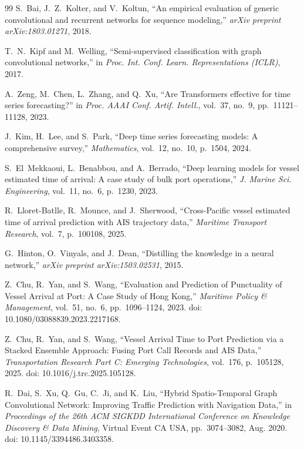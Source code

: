 \documentclass[conference]{IEEEtran}
\begin{document}
\begin{thebibliography}{99}
S.~Bai, J.~Z.~Kolter, and V.~Koltun, ``An empirical evaluation of generic convolutional and recurrent networks for sequence modeling,'' \textit{arXiv preprint arXiv:1803.01271}, 2018.

T.~N.~Kipf and M.~Welling, ``Semi-supervised classification with graph convolutional networks,'' in \textit{Proc. Int. Conf. Learn. Representations (ICLR)}, 2017.

A.~Zeng, M.~Chen, L.~Zhang, and Q.~Xu, ``Are Transformers effective for time series forecasting?'' in \textit{Proc. AAAI Conf. Artif. Intell.}, vol.~37, no.~9, pp.~11121--11128, 2023.

J.~Kim, H.~Lee, and S.~Park, ``Deep time series forecasting models: A comprehensive survey,'' \textit{Mathematics}, vol.~12, no.~10, p.~1504, 2024.

S.~El~Mekkaoui, L.~Benabbou, and A.~Berrado, ``Deep learning models for vessel estimated time of arrival: A case study of bulk port operations,'' \textit{J. Marine Sci. Engineering}, vol.~11, no.~6, p.~1230, 2023.

R.~Lloret-Batlle, R.~Mounce, and J.~Sherwood, ``Cross-Pacific vessel estimated time of arrival prediction with AIS trajectory data,'' \textit{Maritime Transport Research}, vol.~7, p.~100108, 2025.

G.~Hinton, O.~Vinyals, and J.~Dean, ``Distilling the knowledge in a neural network,'' \textit{arXiv preprint arXiv:1503.02531}, 2015.

Z.~Chu, R.~Yan, and S.~Wang, ``Evaluation and Prediction of Punctuality of Vessel Arrival at Port: A Case Study of Hong Kong,'' \textit{Maritime Policy \& Management}, vol.~51, no.~6, pp.~1096--1124, 2023. doi: 10.1080/03088839.2023.2217168.

Z.~Chu, R.~Yan, and S.~Wang, ``Vessel Arrival Time to Port Prediction via a Stacked Ensemble Approach: Fusing Port Call Records and AIS Data,'' \textit{Transportation Research Part C: Emerging Technologies}, vol.~176, p.~105128, 2025. doi: 10.1016/j.trc.2025.105128.

R.~Dai, S.~Xu, Q.~Gu, C.~Ji, and K.~Liu, ``Hybrid Spatio-Temporal Graph Convolutional Network: Improving Traffic Prediction with Navigation Data,'' in \textit{Proceedings of the 26th ACM SIGKDD International Conference on Knowledge Discovery \& Data Mining}, Virtual Event CA USA, pp.~3074--3082, Aug. 2020. doi: 10.1145/3394486.3403358.


\end{thebibliography}
\end{document}

